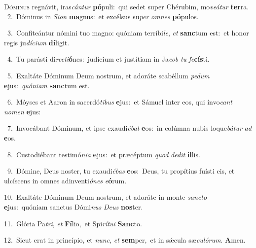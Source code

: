\lettrine{\initial\textcolor{\initialcolor}{D}}{óminus} regnávit, iras\-\textit{cán}\-\textit{tur} \textbf{pó}\-puli:~\star qui sedet super Chérubim, mo\-\textit{ve}\-\textit{á}\textit{tur} \textbf{ter}\-ra.\\
{\numbfont\textcolor{\numbcolor}{~2.}}~Dóminus in \textit{Si}\-\textit{on} \textbf{ma}\-gnus:~\star et excélsus su\textit{per} \textit{om}\-\textit{nes} \textbf{pó}\-pulos.\par
{\numbfont\textcolor{\numbcolor}{~3.}}~Confiteántur nómini tuo magno: quóniam terríbi\-\textit{le}\-, \textit{et} \textbf{sanc}\-tum est:~\star et honor regis ju\-\textit{dí}\-\textit{ci}\textit{um} \textbf{dí}\-ligit.\par
{\numbfont\textcolor{\numbcolor}{~4.}}~Tu parásti di\-\textit{rec}\-\textit{ti}\textbf{ó}nes:~\star judícium et justítiam in Ja\textit{cob} \textit{tu} \textit{fe}\-\textbf{cís}ti.\par
{\numbfont\textcolor{\numbcolor}{~5.}}~Exaltáte Dóminum Deum nostrum, et adoráte scabéllum \textit{pe}\-\textit{dum} \textbf{e}\-jus:~\star \textit{quón}\-\textit{i}\textit{am} \textbf{sanc}\-tum est.\par
{\numbfont\textcolor{\numbcolor}{~6.}}~Móyses et Aaron in sacerdó\-\textit{ti}\-\textit{bus} \textbf{e}\-jus:~\star et Sámuel inter eos, qui ínvo\textit{cant} \textit{no}\-\textit{men} \textbf{e}\-jus:\par
{\numbfont\textcolor{\numbcolor}{~7.}}~Invocábant Dóminum, et ipse exaudi\-\textit{é}\-\textit{bat} \textbf{e}\-os:~\star in colúmna nubis loque\-\textit{bá}\-\textit{tur} \textit{ad} \textbf{e}\-os.\par
{\numbfont\textcolor{\numbcolor}{~8.}}~Custodiébant testimó\-\textit{ni}\-\textit{a} \textbf{e}\-jus:~\star et præcéptum \textit{quod} \textit{de}\-\textit{dit} \textbf{il}\-lis.\par
{\numbfont\textcolor{\numbcolor}{~9.}}~Dómine, Deus noster, tu exaudi\-\textit{é}\-\textit{bas} \textbf{e}\-os:~\star Deus, tu propítius fuísti eis, et ulcíscens in omnes adinventi\-\textit{ó}\-\textit{nes} \textit{e}\-\textbf{ó}rum.\par
{\numbfont\textcolor{\numbcolor}{10.}}~Exaltáte Dóminum Deum nostrum, et adoráte in monte \textit{sanc}\-\textit{to} \textbf{e}\-jus:~\star quóniam sanctus Dómi\textit{nus} \textit{De}\-\textit{us} \textbf{nos}\-ter.\par
{\numbfont\textcolor{\numbcolor}{11.}}~Glória Pa\-\textit{tri}\-, \textit{et} \textbf{Fí}\-lio,~\star et Spi\-\textit{rí}\-\textit{tu}\textit{i} \textbf{Sanc}\-to.\par
{\numbfont\textcolor{\numbcolor}{12.}}~Sicut erat in princípio, et \textit{nunc}\-, \textit{et} \textbf{sem}\-per,~\star et in sǽcula sæ\-\textit{cu}\-\textit{ló}\textit{rum}. \textbf{A}\-men.\par
